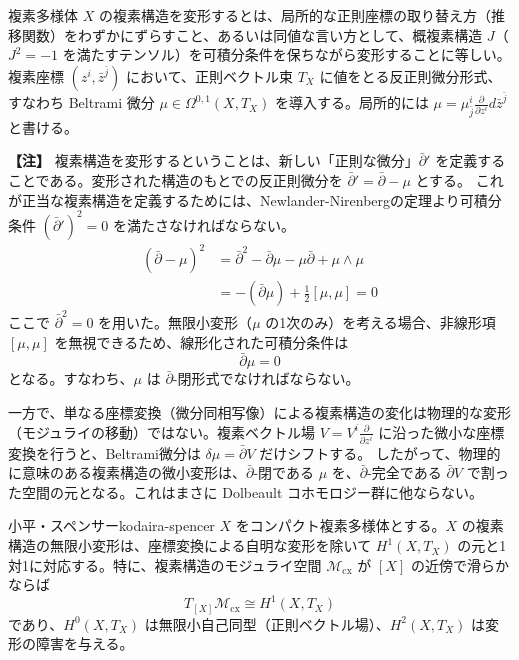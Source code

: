 \documentclass[uplatex, dvipdfmx, book]{jsbook}
\newenvironment{note}{\vspace{1ex}\par\footnotesize\noindent\textbf{【注】}}{\par\vspace{1ex}}
\begin{document}
複素多様体 $X$ の複素構造を変形するとは、局所的な正則座標の取り替え方（推移関数）をわずかにずらすこと、あるいは同値な言い方として、概複素構造 $J$（$J^2 = -1$ を満たすテンソル）を可積分条件を保ちながら変形することに等しい。
複素座標 $(z^i, \bar{z}^{\bar{j}})$ において、正則ベクトル束 $T_X$ に値をとる反正則微分形式、すなわち Beltrami 微分 $\mu \in \Omega^{0,1}(X, T_X)$ を導入する。局所的には $\mu = \mu_{\bar{j}}^i \frac{\partial}{\partial z^i} d\bar{z}^{\bar{j}}$ と書ける。

\begin{note}
複素構造を変形するということは、新しい「正則な微分」$\bar{\partial}'$ を定義することである。変形された構造のもとでの反正則微分を $\bar{\partial}' = \bar{\partial} - \mu$ とする。
これが正当な複素構造を定義するためには、Newlander-Nirenbergの定理より可積分条件 $(\bar{\partial}')^2 = 0$ を満たさなければならない。
\begin{align*}
(\bar{\partial} - \mu)^2 &= \bar{\partial}^2 - \bar{\partial}\mu - \mu\bar{\partial} + \mu \wedge \mu \\
&= - (\bar{\partial}\mu) + \frac{1}{2}[\mu, \mu] = 0
\end{align*}
ここで $\bar{\partial}^2 = 0$ を用いた。無限小変形（$\mu$ の1次のみ）を考える場合、非線形項 $[\mu, \mu]$ を無視できるため、線形化された可積分条件は
\begin{equation}
    \bar{\partial} \mu = 0
\end{equation}
となる。すなわち、$\mu$ は $\bar{\partial}$-閉形式でなければならない。
\end{note}

一方で、単なる座標変換（微分同相写像）による複素構造の変化は物理的な変形（モジュライの移動）ではない。複素ベクトル場 $V = V^i \frac{\partial}{\partial z^i}$ に沿った微小な座標変換を行うと、Beltrami微分は $\delta \mu = \bar{\partial} V$ だけシフトする。
したがって、物理的に意味のある複素構造の微小変形は、$\bar{\partial}$-閉である $\mu$ を、$\bar{\partial}$-完全である $\bar{\partial}V$ で割った空間の元となる。これはまさに Dolbeault コホモロジー群に他ならない。

\begin{mythm}{小平・スペンサー}{kodaira-spencer}
$X$ をコンパクト複素多様体とする。$X$ の複素構造の無限小変形は、座標変換による自明な変形を除いて $H^1(X, T_X)$ の元と1対1に対応する。特に、複素構造のモジュライ空間 $\mathcal{M}_{\text{cx}}$ が $[X]$ の近傍で滑らかならば
\begin{equation*}
    T_{[X]} \mathcal{M}_{\text{cx}} \cong H^{1}(X, T_X)
\end{equation*}
であり、$H^0(X, T_X)$ は無限小自己同型（正則ベクトル場）、$H^2(X, T_X)$ は変形の障害を与える。
\end{mythm}
\end{document}

